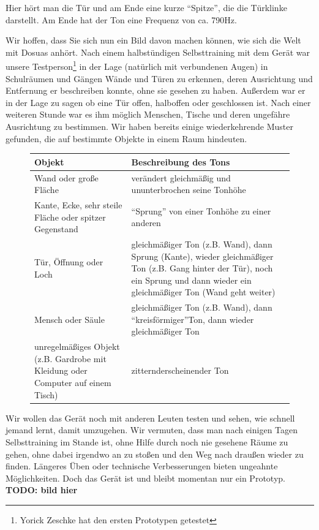\documentclass[a4paper,12pt,ngerman]{scrartcl}
\begin{document}
Hier hört man die Tür und am Ende eine kurze \enquote{Spitze}, die die Türklinke darstellt. Am Ende hat der Ton
eine Frequenz von ca. 790Hz.\par 
Wir hoffen, dass Sie sich nun ein Bild davon machen können, wie sich die Welt mit Dosuas anhört. Nach einem
halbstündigen Selbsttraining mit dem Gerät war unsere Testperson\footnote{Yorick Zeschke hat den ersten Prototypen
getestet} in der Lage (natürlich mit verbundenen Augen) in Schulräumen und Gängen
Wände und Türen zu erkennen, deren Ausrichtung und Entfernung er beschreiben konnte, ohne sie gesehen zu haben.
Außerdem war er in der Lage zu sagen ob eine Tür offen, halboffen oder geschlossen ist. Nach einer weiteren Stunde
war es ihm möglich Menschen, Tische und deren ungefähre Ausrichtung zu bestimmen. 
Wir haben bereits einige wiederkehrende Muster gefunden, die auf bestimmte Objekte in einem Raum hindeuten. 
\begin{figure}[h]
	\begin{tabular}{| p{} | p{} |}
		\hline
		Objekt & Beschreibung des Tons \\ \hline
		Wand oder große Fläche & verändert gleichmäßig und ununterbrochen seine Tonhöhe \\ \hline
		Kante, Ecke, sehr steile Fläche oder spitzer Gegenstand & \enquote{Sprung} von einer Tonhöhe zu einer 
		anderen \\ \hline
		Tür, Öffnung oder Loch & gleichmäßiger Ton (z.B. Wand), dann Sprung (Kante), wieder gleichmäßiger Ton
		(z.B. Gang hinter der Tür), noch ein Sprung und dann wieder ein gleichmäßiger Ton (Wand geht weiter) \\ \hline 
		Mensch oder Säule & gleichmäßiger Ton (z.B. Wand), dann \enquote{kreisförmiger}\footnotemark Ton, dann wieder gleichmäßiger Ton \\ \hline
		unregelmäßiges Objekt (z.B. Gardrobe mit Kleidung oder Computer auf einem Tisch) & zitternd\footnotemark erscheinender Ton \\ \hline 
	\end{tabular}
\end{figure} \par
{}
Wir wollen das Gerät noch mit
anderen Leuten testen und sehen, wie schnell jemand lernt, damit umzugehen. Wir vermuten, dass man nach einigen 
Tagen Selbsttraining im Stande ist, ohne Hilfe durch noch nie gesehene Räume zu gehen, ohne dabei irgendwo an zu
stoßen und den Weg nach draußen wieder zu finden. Längeres Üben oder technische Verbesserungen bieten ungeahnte
Möglichkeiten. Doch das Gerät ist und bleibt momentan nur ein Prototyp. \textbf{TODO: bild hier}
\end{document}
